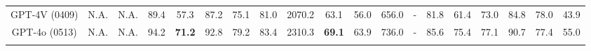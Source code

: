 \begin{table*}[ht]
{\begin{tabular}{ccc|cccccccccccccccc}
        GPT-4V (0409) & \hspace{-0.9em}N.A. & \hspace{-0.9em}N.A. & \hspace{-0.5em}89.4 & \hspace{-0.9em}57.3 & \hspace{-0.9em}87.2 & \hspace{-0.9em}75.1 & \hspace{-0.9em}81.0 & \hspace{-0.9em}2070.2 & \hspace{-0.9em}63.1 & \hspace{-0.9em}56.0 & \hspace{-0.9em}656.0 & \hspace{-0.9em}- & \hspace{-0.9em}81.8 & \hspace{-0.9em}61.4 & \hspace{-0.9em}73.0 & \hspace{-0.9em}84.8 & \hspace{-0.9em}78.0 & \hspace{-0.9em}43.9 \\ 
        \rowcolor{tablegray}
        GPT-4o (0513) & \hspace{-0.9em}N.A. & \hspace{-0.9em}N.A. & \hspace{-0.5em}94.2 & \hspace{-0.9em}\textbf{71.2} & \hspace{-0.9em}92.8 & \hspace{-0.9em}79.2 & \hspace{-0.9em}83.4 & \hspace{-0.9em}2310.3 & \hspace{-0.9em}\textbf{69.1} & \hspace{-0.9em}63.9 & \hspace{-0.9em}736.0 & \hspace{-0.9em}- & \hspace{-0.9em}85.6 & \hspace{-0.9em}75.4 & \hspace{-0.9em}77.1 & \hspace{-0.9em}90.7 & \hspace{-0.9em}77.4 & \hspace{-0.9em}55.0 \\ 
        \rowcolor{tablegray}

\end{tabular}}
\end{table*}
